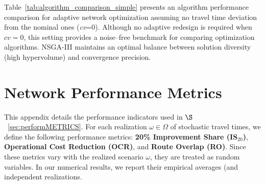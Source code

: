 \documentclass[a4paper,fleqn]{cas-sc}
\begin{document}
Table~\ref{tab:algorithm_comparison_simple} presents an algorithm performance comparison for adaptive network optimization assuming no travel time deviation from the nominal ones (\textit{cv}=0).
Although no adaptive redesign is required when $cv=0$, this setting provides a noise–free benchmark for comparing optimization algorithms.
NSGA-III maintains an optimal balance between solution diversity (high hypervolume) and convergence precision.
%


\section{Network Performance Metrics}\label{A.PerformanceMetrics}

This appendix details the performance indicators used in $\S$~\ref{sec:performMETRICS}.
For each realization $\omega \in \Omega$ of stochastic travel times, we define the following performance metrics: \textbf{20\% Improvement Share (IS$_{20}$)}, \textbf{Operational Cost Reduction (OCR)}, and \textbf{Route Overlap (RO)}. Since these metrics vary with the realized scenario $\omega$, they are treated as random variables. In our numerical results, we report their empirical averages (and  independent realizations.
\end{document}
